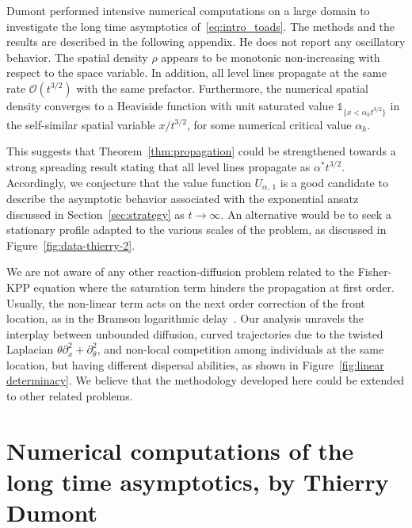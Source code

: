 \documentclass[AHL,Unicode,longabstracts]{cedram}
\newcommand{\mO}{\mathcal{O}}
\newcommand{\1}{\mathds{1}}
\begin{document}
Dumont performed intensive numerical computations on a large domain to investigate the long time asymptotics of~\eqref{eq:intro_toads}. The methods and the results are described in the following appendix. He does not report any oscillatory behavior. The spatial density $\rho$ appears to be monotonic non-increasing with respect to the space variable. In addition, all level lines propagate at the same rate $\mO(t^{3/2})$ with the same prefactor. Furthermore, the numerical spatial density converges to a Heaviside function with unit saturated value $\1_{\{x< \alpha_h t^{3/2}\}}$ in the self-similar spatial variable $x/t^{3/2}$, for some numerical critical value $\alpha_h$.

This suggests that Theorem~\ref{thm:propagation} could be strengthened towards a strong spreading result stating that all level lines propagate as $\alpha^* t^{3/2}$. Accordingly, we conjecture that the value function $U_{\alpha,\,1}$ is a good candidate to describe the asymptotic behavior associated with the exponential ansatz discussed in Section~\ref{sec:strategy} as $t\to \infty$. An alternative would be to seek a stationary profile adapted to the various scales of the problem, as discussed in Figure~\ref{fig:data-thierry-2}.

We are not aware of any other reaction-diffusion problem related to the Fisher-KPP equation where the saturation term hinders the propagation at first order. Usually, the non-linear term acts on the next order correction of the front location, as in the Bramson logarithmic delay~\cite{BHR_LogDelay,Bramson83,HNRR13,Penington}. Our analysis unravels the interplay between unbounded diffusion, curved trajectories due to the twisted Laplacian $\theta \partial^2_x + \partial^2_\theta$, and non-local competition among individuals at the same location, but having different dispersal abilities, as shown in Figure~\ref{fig:linear determinacy}. We believe that the methodology developed here could be extended to other related problems.






\appendix


\section{Numerical computations of the long time asymptotics, by Thierry Dumont}
\end{document}
